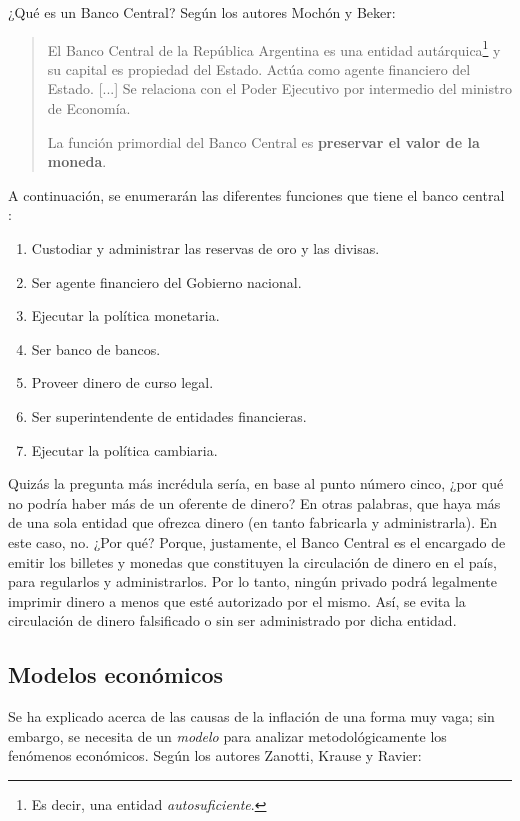 \documentclass[12pt,a4paper,twoside]{book}
\begin{document}
¿Qué es un Banco Central? Según los autores Mochón y Beker:

\begin{quotation}
El Banco Central de la República Argentina es una entidad autárquica\footnote{Es decir, una entidad \textit{autosuficiente}.} y su capital es propiedad del Estado. Actúa como agente financiero del Estado. [...] Se relaciona con el Poder Ejecutivo por intermedio del ministro de Economía.

La función primordial del Banco Central es \textbf{preservar el valor de la moneda}. \cite[pág. 288]{mochobeker}
\end{quotation}

A continuación, se enumerarán las diferentes funciones que tiene el banco central \cite[págs. 288-289]{mochobeker}:

\begin{enumerate}
\item Custodiar y administrar las reservas de oro y las divisas.
\item Ser agente financiero del Gobierno nacional.
\item Ejecutar la política monetaria.
\item Ser banco de bancos.
\item Proveer dinero de curso legal.
\item Ser superintendente de entidades financieras.
\item Ejecutar la política cambiaria.
\end{enumerate}

Quizás la pregunta más incrédula sería, en base al punto número cinco, ¿por qué no podría haber más de un oferente de dinero? En otras palabras, que haya más de una sola entidad que ofrezca dinero (en tanto fabricarla y administrarla). En este caso, no. ¿Por qué? Porque, justamente, el Banco Central es el encargado de emitir los billetes y monedas que constituyen la circulación de dinero en el país, para regularlos y administrarlos. Por lo tanto, ningún privado podrá legalmente imprimir dinero a menos que esté autorizado por el mismo. Así, se evita la circulación de dinero falsificado o sin ser administrado por dicha entidad.

\subsection{Modelos económicos}
Se ha explicado acerca de las causas de la inflación de una forma muy vaga; sin embargo, se necesita de un \textit{modelo} para analizar metodológicamente los fenómenos económicos. Según los autores Zanotti, Krause y Ravier:
\end{document}
